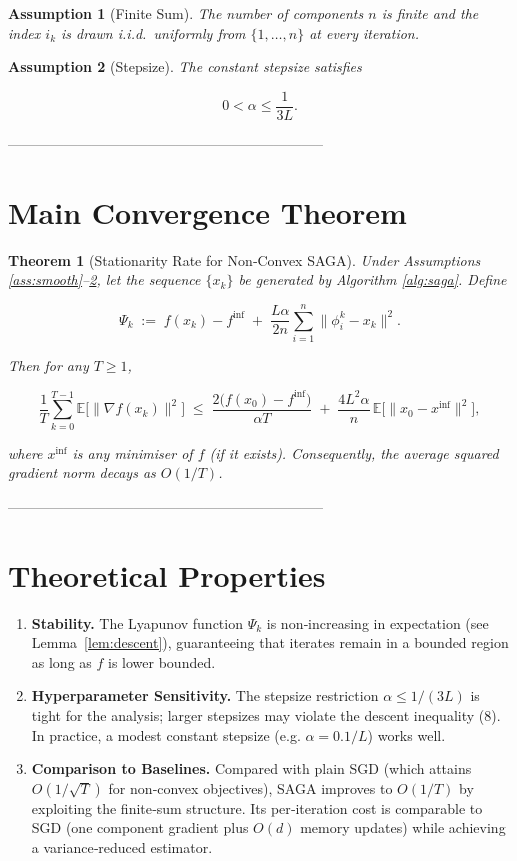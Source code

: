 \documentclass{article}
\newtheorem{theorem}{Theorem}
\newtheorem{assumption}{Assumption}
\newcommand{\E}{\mathbb{E}}
\newcommand{\grad}{\nabla}
\begin{document}
\begin{assumption}[Finite Sum]\label{ass:finite}
The number of components $n$ is finite and the index $i_k$ is drawn i.i.d.\ uniformly from $\{1,\dots ,n\}$ at every iteration.
\end{assumption}

\begin{assumption}[Stepsize]\label{ass:stepsize}
The constant stepsize satisfies  

\[
0<\alpha\le\frac{1}{3L}.
\tag{6}
\]
\end{assumption}

--------------------------------------------------------------------

\section*{Main Convergence Theorem}
\begin{theorem}[Stationarity Rate for Non‑Convex SAGA]\label{thm:main}
Under Assumptions \ref{ass:smooth}–\ref{ass:stepsize}, let the sequence $\{x_k\}$ be generated by Algorithm \ref{alg:saga}. Define  

\[
\Psi_k\;:=\; f(x_k)-f^{\inf}
          \;+\;\frac{L\alpha}{2n}\sum_{i=1}^{n}\| \phi_i^{k}-x_k\|^{2}.
\tag{7}
\]

Then for any $T\ge 1$,

\[
\frac{1}{T}\sum_{k=0}^{T-1}\E\!\bigl[\|\grad f(x_k)\|^{2}\bigr]
\;\le\;
\frac{2\bigl(f(x_0)-f^{\inf}\bigr)}{\alpha T}
\;+\;
\frac{4L^{2}\alpha}{n}\,
\E\!\bigl[\|x_0-x^{\inf}\|^{2}\bigr],
\tag{8}
\]

where $x^{\inf}$ is any minimiser of $f$ (if it exists). Consequently, the average squared gradient norm decays as $O(1/T)$.
\end{theorem}

--------------------------------------------------------------------

\section*{Theoretical Properties}
\begin{enumerate}[label=\arabic*.]
\item \textbf{Stability.} The Lyapunov function $\Psi_k$ is non‑increasing in expectation (see Lemma~\ref{lem:descent}), guaranteeing that iterates remain in a bounded region as long as $f$ is lower bounded.
\item \textbf{Hyperparameter Sensitivity.} The stepsize restriction $\alpha\le 1/(3L)$ is tight for the analysis; larger stepsizes may violate the descent inequality (8). In practice, a modest constant stepsize (e.g. $\alpha=0.1/L$) works well.
\item \textbf{Comparison to Baselines.} Compared with plain SGD (which attains $O(1/\sqrt{T})$ for non‑convex objectives), SAGA improves to $O(1/T)$ by exploiting the finite‑sum structure. Its per‑iteration cost is comparable to SGD (one component gradient plus $O(d)$ memory updates) while achieving a variance‑reduced estimator.
\end{enumerate}
\end{document}
